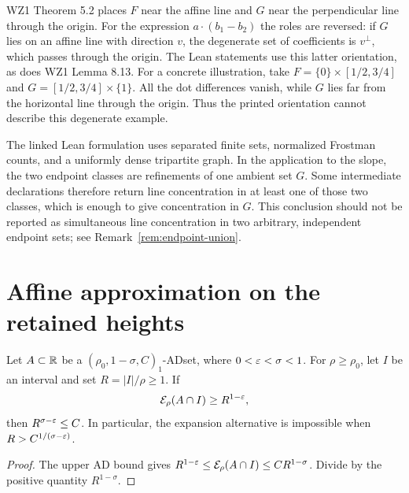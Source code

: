 \begin{remark}
\label{rem:projection-orientation}
WZ1 Theorem 5.2 places $F$ near the affine line and $G$ near the
perpendicular line through the origin. For the expression
$a\cdot(b_1-b_2)$ the roles are reversed: if $G$ lies on an affine
line with direction $v$, the degenerate set of coefficients is
$v^\perp$, which passes through the origin. The Lean statements use
this latter orientation, as does WZ1 Lemma 8.13.
For a concrete illustration, take
$F=\{0\}\times[1/2,3/4]$ and
$G=[1/2,3/4]\times\{1\}$. All the dot differences vanish, while
$G$ lies far from the horizontal line through the origin. Thus the
printed orientation cannot describe this degenerate example.
\end{remark}

\begin{remark}
\label{rem:projection-model}
The linked Lean formulation uses separated finite sets, normalized
Frostman counts, and a uniformly dense tripartite graph. In the
application to the slope, the two endpoint classes are refinements of
one ambient set $G$. Some intermediate declarations therefore return
line concentration in at least one of those two classes, which is
enough to give concentration in $G$. This conclusion should not be
reported as simultaneous line concentration in two arbitrary,
independent endpoint sets; see Remark~\ref{rem:endpoint-union}.
\end{remark}

\section{Affine approximation on the retained heights}

\begin{lemma}
\label{lem:ad-expansion-gap}
Let $A\subset\mathbb{R}$ be a $(\rho_0,1-\sigma,C)_1$-ADset, where
$0<\varepsilon<\sigma<1$. For $\rho\geq\rho_0$, let $I$ be an interval and set
$R=|I|/\rho\geq1$. If
\[
                \mathcal{E}_\rho(A\cap I)\geq R^{1-\varepsilon},
\]
then $R^{\sigma-\varepsilon}\leq C$. In particular, the expansion
alternative is impossible when $R>C^{1/(\sigma-\varepsilon)}$.
\end{lemma}
\begin{proof}
The upper AD bound gives
$R^{1-\varepsilon}\leq\mathcal{E}_\rho(A\cap I)\leq CR^{1-\sigma}$.
Divide by the positive quantity $R^{1-\sigma}$.
\end{proof}

